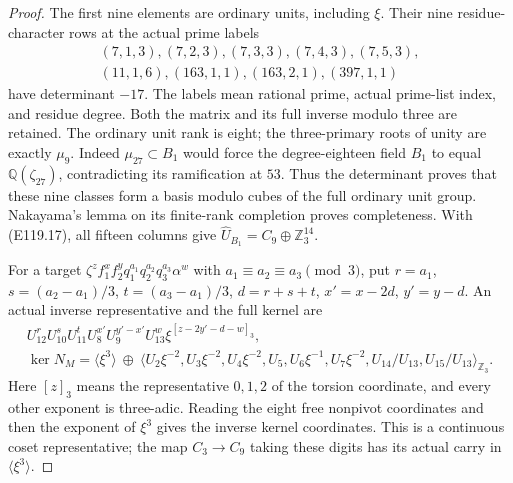 \begin{proof}
The first nine elements are ordinary units, including $\xi$.
Their nine residue-character rows at the actual prime labels
\[
 \begin{gathered}
 (7,1,3),(7,2,3),(7,3,3),(7,4,3),(7,5,3),\\
 (11,1,6),(163,1,1),(163,2,1),(397,1,1)
 \end{gathered}
\]
have determinant $-17$.
The labels mean rational prime, actual prime-list index,
and residue degree. Both the matrix and its full inverse
modulo three are retained. The ordinary unit rank is eight;
the three-primary roots of unity are exactly $\mu_9$.
Indeed $\mu_{27}\subset B_1$ would force the degree-eighteen
field $B_1$ to equal $\mathbb Q(\zeta_{27})$, contradicting
its ramification at $53$. Thus the determinant proves that
these nine classes form a basis modulo cubes of the full
ordinary unit group. Nakayama's lemma on its finite-rank
completion proves completeness. With (E119.17), all fifteen
columns give
$\widehat U_{B_1}=C_9\oplus\mathbb Z_3^{14}$.

For a target
$\zeta^z f_1^x f_2^y q_1^{a_1}q_2^{a_2}q_3^{a_3}\alpha^w$
with $a_1\equiv a_2\equiv a_3\pmod3$, put
$r=a_1$, $s=(a_2-a_1)/3$, $t=(a_3-a_1)/3$,
$d=r+s+t$, $x'=x-2d$, $y'=y-d$.
An actual inverse representative and the full kernel are
\[
 \begin{gathered}
 U_{12}^{r}U_{10}^{s}U_{11}^{t}U_8^{x'}U_9^{y'-x'}U_{13}^{w}
            \xi^{[z-2y'-d-w]_3},\\
 \ker N_M=\langle\xi^3\rangle\ \oplus\
 \langle U_2\xi^{-2},U_3\xi^{-2},U_4\xi^{-2},U_5,
 U_6\xi^{-1},U_7\xi^{-2},U_{14}/U_{13},U_{15}/U_{13}\rangle_{\mathbb Z_3}.
 \end{gathered}
 \tag{E119.18}
\]
Here $[z]_3$ means the representative $0,1,2$ of the torsion
coordinate, and every other exponent is three-adic. Reading
the eight free nonpivot coordinates and then the exponent
of $\xi^3$ gives the inverse kernel coordinates. This is a
continuous coset representative; the map $C_3\to C_9$ taking
these digits has its actual carry in $\langle\xi^3\rangle$.


\end{proof}
